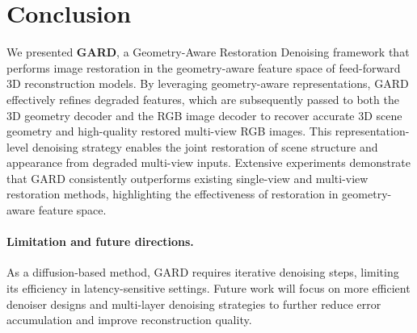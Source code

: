 





\section{Conclusion}
\label{sec:conclusion}

We presented \textbf{GARD}, a Geometry-Aware Restoration Denoising framework that performs image restoration in the geometry-aware feature space of feed-forward 3D reconstruction models. By leveraging geometry-aware representations, GARD effectively refines degraded features, which are subsequently passed to both the 3D geometry decoder and the RGB image decoder to recover accurate 3D scene geometry and high-quality restored multi-view RGB images. This representation-level denoising strategy enables the joint restoration of scene structure and appearance from degraded multi-view inputs. Extensive experiments demonstrate that GARD consistently outperforms existing single-view and multi-view restoration methods, highlighting the effectiveness of restoration in geometry-aware feature space.

\paragraph{Limitation and future directions.}
As a diffusion-based method, GARD requires iterative denoising steps, limiting its efficiency in latency-sensitive settings. Future work will focus on more efficient denoiser designs and multi-layer denoising strategies to further reduce error accumulation and improve reconstruction quality.



\clearpage